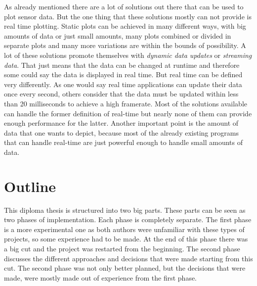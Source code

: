 \author{Nico Leidenfrost}
%
As already mentioned there are a lot of solutions out there that can be used to plot sensor data. But the one thing that these solutions mostly can not provide is real time plotting. Static plots can be achieved in many different ways, with big amounts of data or just small amounts, many plots combined or divided in separate plots and many more variations are within the bounds of possibility. A lot of these solutions promote themselves with \textit{dynamic data updates} or \textit{streaming data}. That just means that the data can be changed at runtime and therefore some could say the data is displayed in real time. But real time can be defined very differently. As one would say real time applications can update their data once every second, others consider that the data must be updated within less than 20 milliseconds to achieve a high framerate. Most of the solutions available can handle the former definition of real-time but nearly none of them can provide enough performance for the latter. Another important point is the amount of data that one wants to depict, because most of the already existing programs that can handle real-time are just powerful enough to handle small amounts of data.

\section{Outline}

This diploma thesis is structured into two big parts. These parts can be seen as two phases of implementation. Each phase is completely separate. The first phase is a more experimental one as both authors were unfamiliar with these types of projects, so some experience had to be made. At the end of this phase there was a big cut and the project was restarted from the beginning. The second phase discusses the different approaches and decisions that were made starting from this cut. The second phase was not only better planned, but the decisions that were made, were mostly made out of experience from the first phase.
